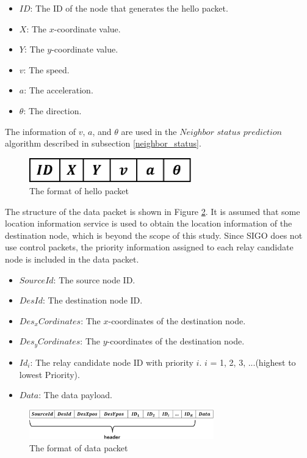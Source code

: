 \documentclass[conference]{IEEEtran}
\begin{document}
\begin{itemize}
\item $ID$: The ID of the node that generates the hello packet.
\item $X$: The $x$-coordinate value.
\item $Y$: The $y$-coordinate value.
\item $v$: The speed.
\item $a$: The acceleration.
\item $\theta$: The direction.
\end{itemize}
The information of  $v$, $a$, and $\theta$ are used in the $Neighbor$ $status$ $prediction$ algorithm described in subsection \ref{neighbor_status}.

\begin{figure}[!ht]
\centering
\includegraphics[width=70mm]{figures/hellopacket_format.eps}
\caption{The format of hello packet}
\label{fig:hellopacket}
\end{figure}

The structure of the data packet is shown in Figure \ref{fig:datapacket}. It is assumed that some location information service is used to obtain the location information of the destination node, which is beyond the scope of this study. 
Since SIGO does not use control packets, the priority information assigned to each relay candidate node is included in the data packet.

\begin{itemize}
\item $SourceId$: The source node ID.
\item $DesId$: The destination node ID.
\item $Des_x Cordinates$: The $x$-coordinates of the destination node.
\item $Des_y Cordinates$: The $y$-coordinates of the destination node.
\item $Id_i$: The relay candidate node ID with priority $i$. $i$ = 1, 2, 3, ...(highest to lowest Priority). 
\item $Data$: The data payload.
\end{itemize}

\begin{figure}[!ht]
\centering
\includegraphics[width=80mm]{figures/data_packet_format.eps}
\caption{The format of data packet}
\label{fig:datapacket}
\end{figure}
\end{document}
